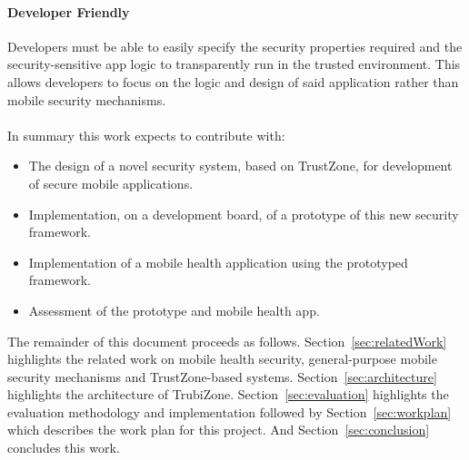 \paragraph*{\textbf{Developer Friendly\\}} Developers must be able to easily specify the security properties required and the security-sensitive app logic to transparently run in the trusted environment. This allows developers to focus on the logic and design of said application rather than mobile security mechanisms.\\\\
%
%
%
In summary this work expects to contribute with:
\begin{itemize}
	\item The design of a novel security system, based on TrustZone, for development of secure mobile applications.
	\item Implementation, on a development board, of a prototype of this new security framework.
	\item Implementation of a mobile health application using the prototyped framework.
	\item Assessment of the prototype and mobile health app.
\end{itemize}

%
The remainder of this document proceeds as follows. Section~\ref{sec:relatedWork} highlights the related work on mobile health security, general-purpose mobile security mechanisms and TrustZone-based systems. Section~\ref{sec:architecture} highlights the architecture of TrubiZone. Section~\ref{sec:evaluation} highlights the evaluation methodology and implementation followed by Section~\ref{sec:workplan} which describes the work plan for this project. And Section~\ref{sec:conclusion} concludes this work.
